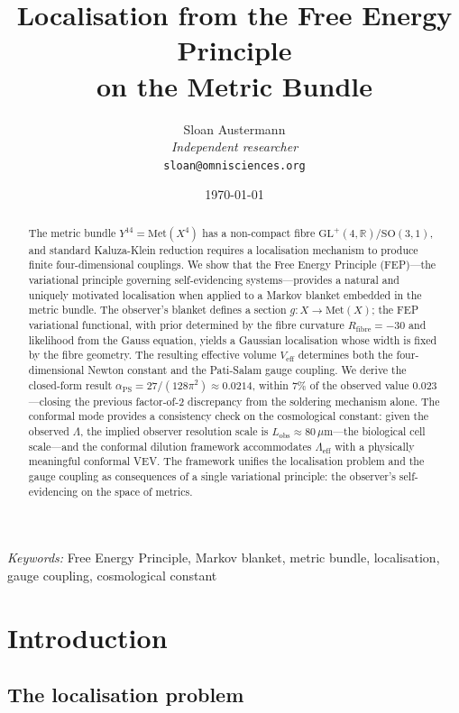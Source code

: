 \documentclass[12pt, a4paper]{article}
\title{\textbf{Localisation from the Free Energy Principle\\on the Metric Bundle}}
\author{Sloan Austermann\\[4pt]
\small\textit{Independent researcher}\\
\small\texttt{sloan@omnisciences.org}}
\date{\today}
\theoremstyle{definition}
\theoremstyle{remark}
\newcommand{\R}{\mathbb{R}}
\newcommand{\Met}{\mathrm{Met}}
\newcommand{\SO}{\mathrm{SO}}
\newcommand{\GL}{\mathrm{GL}}
\newcommand{\Veff}{V_{\mathrm{eff}}}
\newcommand{\aPS}{\alpha_{\mathrm{PS}}}
\newcommand{\Lobs}{L_{\mathrm{obs}}}
\newcommand{\Rfibre}{R_{\mathrm{fibre}}}
\begin{document}
\maketitle

\begin{abstract}
The metric bundle $Y^{14} = \Met(X^4)$ has a non-compact fibre $\GL^+(4,\R)/\SO(3,1)$, and standard Kaluza-Klein reduction requires a localisation mechanism to produce finite four-dimensional couplings.
We show that the Free Energy Principle (FEP)---the variational principle governing self-evidencing systems---provides a natural and uniquely motivated localisation when applied to a Markov blanket embedded in the metric bundle.
The observer's blanket defines a section $g: X \to \Met(X)$; the FEP variational functional, with prior determined by the fibre curvature $\Rfibre = -30$ and likelihood from the Gauss equation, yields a Gaussian localisation whose width is fixed by the fibre geometry.
The resulting effective volume $\Veff$ determines both the four-dimensional Newton constant and the Pati-Salam gauge coupling.
We derive the closed-form result $\aPS = 27/(128\pi^2) \approx 0.0214$, within $7\%$ of the observed value $0.023$---closing the previous factor-of-$2$ discrepancy from the soldering mechanism alone.
The conformal mode provides a consistency check on the cosmological constant: given the observed $\Lambda$, the implied observer resolution scale is $\Lobs \approx 80\,\mu\mathrm{m}$---the biological cell scale---and the conformal dilution framework accommodates $\Lambda_{\mathrm{eff}}$ with a physically meaningful conformal VEV.
The framework unifies the localisation problem and the gauge coupling as consequences of a single variational principle: the observer's self-evidencing on the space of metrics.
\end{abstract}

\vspace{10pt}
\noindent\textit{Keywords:} Free Energy Principle, Markov blanket, metric bundle, localisation, gauge coupling, cosmological constant

\newpage
\tableofcontents
\newpage


\section{Introduction}
\label{sec:intro}

\subsection{The localisation problem}
\end{document}
